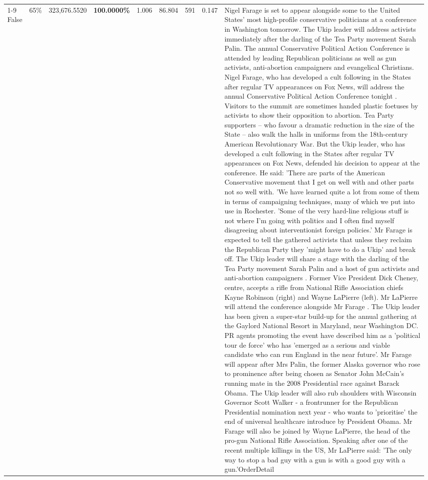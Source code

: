\begin{table}[H]
\begin{tabular}{lllrlllll}
\cline{1-9} \cline{2-9}
False & 65\% & 323,676.5520 & \bfseries \color{red} 100.0000\% & 1.006 & 86.804 & 591 & 0.147 & Nigel Farage is set to appear alongside some to the United States' most high-profile conservative politicians at a conference in Washington tomorrow. The Ukip leader will address activists immediately after the darling of the Tea Party movement Sarah Palin. The annual Conservative Political Action Conference is attended by leading Republican politicians as well as gun activists, anti-abortion campaigners and evangelical Christians. Nigel Farage, who has developed a cult following in the States after regular TV appearances on Fox News, will address the annual Conservative Political Action Conference tonight . Visitors to the summit are sometimes handed plastic foetuses by activists to show their opposition to abortion. Tea Party supporters – who favour a dramatic reduction in the size of the State – also walk the halls in uniforms from the 18th-century American Revolutionary War. But the Ukip leader, who has developed a cult following in the States after regular TV appearances on Fox News, defended his decision to appear at the conference. He said: 'There are parts of the American Conservative movement that I get on well with and other parts not so well with. 'We have learned quite a lot from some of them in terms of campaigning techniques, many of which we put into use in Rochester. 'Some of the very hard-line religious stuff is not where I'm going with politics and I often find myself disagreeing about interventionist foreign policies.' Mr Farage is expected to tell the gathered activists that unless they reclaim the Republican Party they 'might have to do a Ukip' and break off. The Ukip leader will share a stage with the darling of the Tea Party movement Sarah Palin and a host of gun activists and anti-abortion campaigners . Former Vice President Dick Cheney, centre, accepts a rifle from National Rifle Association chiefs Kayne Robinson (right) and Wayne LaPierre (left). Mr LaPierre will attend the conference alongside Mr Farage . The Ukip leader has been given a super-star build-up for the annual gathering at the Gaylord National Resort in Maryland, near Washington DC. PR agents promoting the event have described him as a 'political tour de force' who has 'emerged as a serious and viable candidate who can run England in the near future'. Mr Farage will appear after Mrs Palin, the former Alaska governor who rose to prominence after being chosen as Senator John McCain's running mate in the 2008 Presidential race against Barack Obama. The Ukip leader will also rub shoulders with Wisconsin Governor Scott Walker - a frontrunner for the Republican Presidential nomination next year - who wants to 'prioritise' the end of universal healthcare introduce by President Obama. Mr Farage will also be joined by Wayne LaPierre, the head of the pro-gun National Rifle Association. Speaking after one of the recent multiple killings in the US, Mr LaPierre said: 'The only way to stop a bad guy with a gun is with a good guy with a gun.'OrderDetail \\

\end{tabular}
\end{table}
